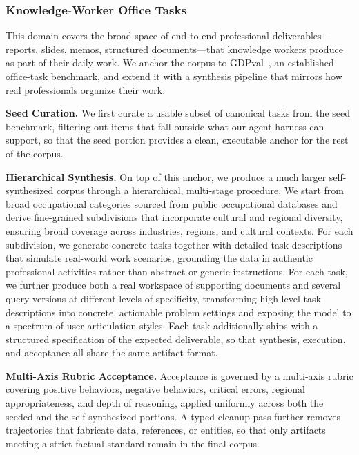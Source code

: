 \subsubsection{Knowledge-Worker Office Tasks}

This domain covers the broad space of end-to-end professional deliverables---reports, slides, memos, structured documents---that knowledge workers produce as part of their daily work. We anchor the corpus to GDPval~\citep{patwardhan2025gdpvalevaluatingaimodel}, an established office-task benchmark, and extend it with a synthesis pipeline that mirrors how real professionals organize their work.

\noindent \textbf{Seed Curation.} We first curate a usable subset of canonical tasks from the seed benchmark, filtering out items that fall outside what our agent harness can support, so that the seed portion provides a clean, executable anchor for the rest of the corpus.

\noindent \textbf{Hierarchical Synthesis.} On top of this anchor, we produce a much larger self-synthesized corpus through a hierarchical, multi-stage procedure. We start from broad occupational categories sourced from public occupational databases and derive fine-grained subdivisions that incorporate cultural and regional diversity, ensuring broad coverage across industries, regions, and cultural contexts. For each subdivision, we generate concrete tasks together with detailed task descriptions that simulate real-world work scenarios, grounding the data in authentic professional activities rather than abstract or generic instructions. For each task, we further produce both a real workspace of supporting documents and several query versions at different levels of specificity, transforming high-level task descriptions into concrete, actionable problem settings and exposing the model to a spectrum of user-articulation styles. Each task additionally ships with a structured specification of the expected deliverable, so that synthesis, execution, and acceptance all share the same artifact format.

\noindent \textbf{Multi-Axis Rubric Acceptance.} Acceptance is governed by a multi-axis rubric covering positive behaviors, negative behaviors, critical errors, regional appropriateness, and depth of reasoning, applied uniformly across both the seeded and the self-synthesized portions. A typed cleanup pass further removes trajectories that fabricate data, references, or entities, so that only artifacts meeting a strict factual standard remain in the final corpus.

